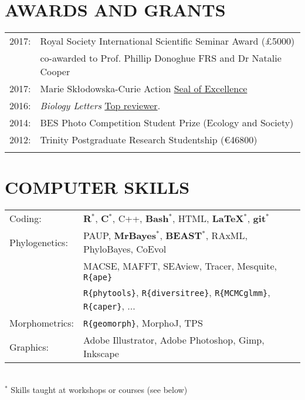 \documentclass[10pt,a4paper]{article}
\begin{document}
{\section{AWARDS AND GRANTS}
\begin{tabular}{ll}
2017: & Royal Society International Scientific Seminar Award (\pounds5000)\\
      & co-awarded to Prof. Phillip Donoghue FRS and Dr Natalie Cooper\\
2017: & Marie Sk\l{}odowska-Curie Action \href{https://ec.europa.eu/research/soe/index.cfm?pg=what}{Seal of Excellence}\\
2016: & \textit{Biology Letters} \href{http://blogs.royalsociety.org/publishing/biology-letters-top-reviewers-from-2016/}{Top reviewer}.\\
2014: & BES Photo Competition Student Prize (Ecology and Society)\\
2012: & Trinity Postgraduate Research Studentship (\euro46800)\\
& \\ 
\end{tabular}
\bigskip

\section{COMPUTER SKILLS}
\begin{tabular}{ll}
Coding: & \textbf{{R}$^{*}$}, \textbf{C$^{*}$}, C++, \textbf{Bash$^{*}$}, HTML, \textbf{\LaTeX$^{*}$}, \textbf{git$^{*}$}\\[1.5ex]
Phylogenetics: & PAUP, \textbf{MrBayes$^{*}$}, \textbf{BEAST$^{*}$}, RAxML, PhyloBayes, CoEvol \\
& MACSE, MAFFT, SEAview, Tracer, Mesquite, \texttt{R\{ape\}} \\
& \texttt{R\{phytools\}}, \texttt{R\{diversitree\}}, \texttt{R\{MCMCglmm\}}, \texttt{R\{caper\}}, ... \\[1.5ex]
Morphometrics: & \texttt{R\{geomorph\}}, MorphoJ, TPS \\[1.5ex]
Graphics: & Adobe Illustrator, Adobe Photoshop, Gimp, Inkscape\\[1.5ex]
\end{tabular} \\
$^{*}$ Skills taught at workshops or courses (see below)
\bigskip

}
\end{document}

